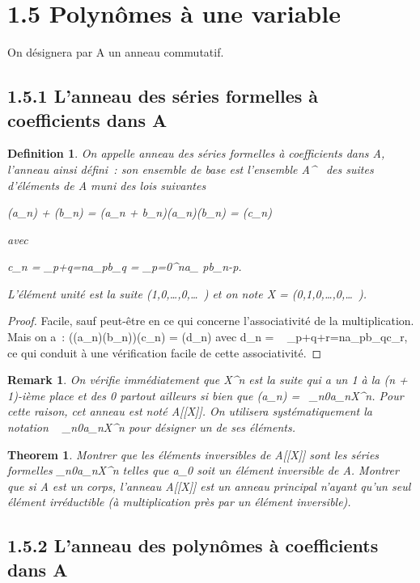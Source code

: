 \documentclass{article}
\newtheorem{theorem}{Theorem}[section]
\newenvironment{thm}
  {\begin{theorem}}
  {\end{theorem}}
\newtheorem{definition}{Definition}[section]
\newenvironment{de}
  {\begin{definition}}
  {\end{definition}}
\newtheorem{remark}{Remark}[section]
\newenvironment{rem}
  {\begin{remark}}
  {\end{remark}}
\begin{document}
\section{1.5 Polynômes à une variable}

On désignera par A un anneau commutatif.

\subsection{1.5.1 L'anneau des séries formelles à coefficients dans A}

\begin{de}
On appelle anneau des séries formelles à coefficients
dans A, l'anneau ainsi défini~: son ensemble de base est l'ensemble
A^~ des suites d'éléments de A muni des lois suivantes

(a_n) + (b_n) = (a_n +
b_n)\quad (a_n)(b_n) =
(c_n)

avec

c_n = \sum
_{p+q=n}a_pb_q = \sum
_{p=0}^na_ pb_{n-p}.

L'élément unité est la suite
(1,0,\ldots,0,\ldots~)
et on note X =
(0,1,0,\ldots,0,\ldots~).
\end{de}

\begin{proof}
Facile, sauf peut-être en ce qui concerne l'associativité
de la multiplication. Mais on a~:
((a_n)(b_n))(c_n) = (d_n) avec
d_n = \sum ~
_{p+q+r=n}a_pb_qc_r, ce qui conduit à
une vérification facile de cette associativité.
\end{proof}

\begin{rem}
On vérifie immédiatement que X^n est la suite
qui a un 1 à la (n + 1)-ième place et des 0 partout ailleurs si bien que
(a_n) =\ \sum
 _n\geq0a_nX^n. Pour cette raison, cet
anneau est noté A[[X]]. On utilisera systématiquement la
notation \sum ~
_n\geq0a_nX^n pour désigner un de ses éléments.
\end{rem}

\begin{thm}
Montrer que les éléments inversibles de A[[X]] sont les
séries formelles \sum
 _n\geq0a_nX^n telles que a_0 soit
un élément inversible de A. Montrer que si A est un corps, l'anneau
A[[X]] est un anneau principal n'ayant qu'un seul élément
irréductible (à multiplication près par un élément inversible).
\end{thm}

\subsection{1.5.2 L'anneau des polynômes à coefficients dans A}
\end{document}
